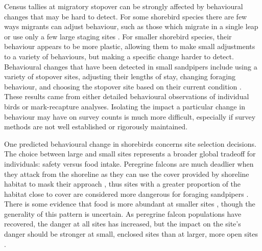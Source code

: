 Census tallies at migratory stopover can be strongly affected by behavioural changes that may be hard to detect. For some shorebird species there are few ways migrants can adjust behaviour, such as those which migrate in a single leap \citep{GillJr.2009} or use only a few large staging sites \citep{Gillings2009b}. For smaller shorebird species, their behaviour appears to be more plastic, allowing them to make small adjustments to a variety of behaviours, but making a specific change harder to detect. Behavioural changes that have been detected in small sandpipers include using a variety of stopover sites, adjusting their lengths of stay, changing foraging behaviour, and choosing the stopover site based on their current condition \citep{Ydenberg2002,Beauchamp2006a,pomeroy_tradeoffs_2006,Dekker2011,Hope2014,Quinn2012a}. These results came from either detailed behavioural observations of individual birds or mark-recapture analyses. Isolating the impact a particular change in behaviour may have on survey counts is much more difficult, especially if survey methods are not well established or rigorously maintained.

One predicted behavioural change in shorebirds concerns site selection decisions. The choice between large and small sites represents a broader global tradeoff for individuals: safety versus food intake. Peregrine falcons are much deadlier when they attack from the shoreline as they can use the cover provided by shoreline habitat to mask their approach \citep{Dekker2011}, thus sites with a greater proportion of the habitat close to cover are considered more dangerous for foraging sandpipers \citep{pomeroy_experimental_2006}. There is some evidence that food is more abundant at smaller sites \citep{Pomeroy2008a,Sprague2008a}, though the generality of this pattern is uncertain. As peregrine falcon populations have recovered, the danger at all sites has increased, but the impact on the site's danger should be stronger at small, enclosed sites than at larger, more open sites \citep{Ydenberg2017}. 

